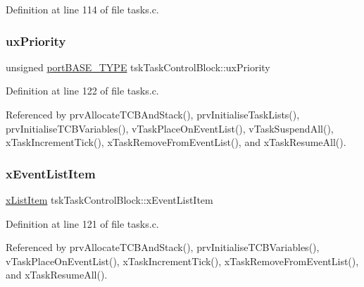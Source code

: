Definition at line 114 of file tasks.\+c.

\mbox{\label{structtskTaskControlBlock_a82357f7be508ac5d27ae7968cddde6da}} 
\subsubsection{\texorpdfstring{ux\+Priority}{uxPriority}}
{\footnotesize\ttfamily unsigned \hyperlink{portmacro_8h_a1ebe82d24d764ae4e352f7c3a9f92c01}{port\+B\+A\+S\+E\+\_\+\+T\+Y\+PE} tsk\+Task\+Control\+Block\+::ux\+Priority}



Definition at line 122 of file tasks.\+c.



Referenced by prv\+Allocate\+T\+C\+B\+And\+Stack(), prv\+Initialise\+Task\+Lists(), prv\+Initialise\+T\+C\+B\+Variables(), v\+Task\+Place\+On\+Event\+List(), v\+Task\+Suspend\+All(), x\+Task\+Increment\+Tick(), x\+Task\+Remove\+From\+Event\+List(), and x\+Task\+Resume\+All().

\mbox{\label{structtskTaskControlBlock_a9b0ee1554f116853c7631dc0b585ffdc}} 
\subsubsection{\texorpdfstring{x\+Event\+List\+Item}{xEventListItem}}
{\footnotesize\ttfamily \hyperlink{list_8h_abc3e65a10b5c5f39142e64e69311797f}{x\+List\+Item} tsk\+Task\+Control\+Block\+::x\+Event\+List\+Item}



Definition at line 121 of file tasks.\+c.



Referenced by prv\+Allocate\+T\+C\+B\+And\+Stack(), prv\+Initialise\+T\+C\+B\+Variables(), v\+Task\+Place\+On\+Event\+List(), x\+Task\+Increment\+Tick(), x\+Task\+Remove\+From\+Event\+List(), and x\+Task\+Resume\+All().

\mbox{\label{structtskTaskControlBlock_a95eb5853a94644043605770f63ac9a63}} 
